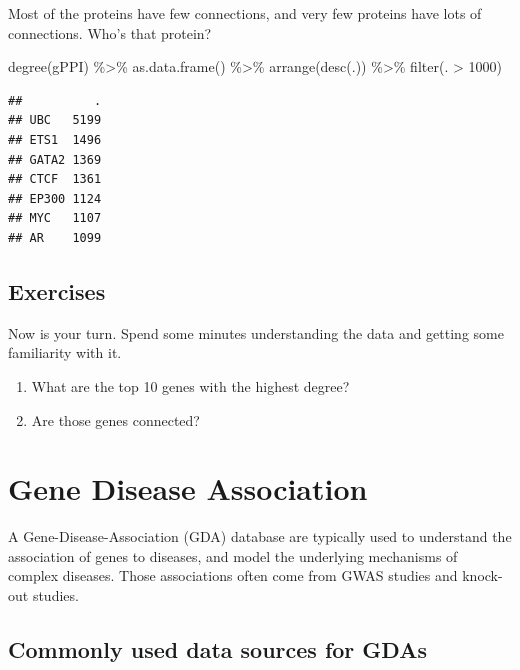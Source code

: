 \documentclass[
]{book}
\newenvironment{Shaded}{\begin{snugshade}}{\end{snugshade}}
\newcommand{\DecValTok}[1]{\textcolor[rgb]{0.00,0.00,0.81}{#1}}
\newcommand{\FunctionTok}[1]{\textcolor[rgb]{0.00,0.00,0.00}{#1}}
\newcommand{\NormalTok}[1]{#1}
\newcommand{\SpecialCharTok}[1]{\textcolor[rgb]{0.00,0.00,0.00}{#1}}
\begin{document}
Most of the proteins have few connections, and very few proteins have lots of connections. Who's that protein?

\begin{Shaded}
\begin{Highlighting}[]
\FunctionTok{degree}\NormalTok{(gPPI) }\SpecialCharTok{\%\textgreater{}\%} 
  \FunctionTok{as.data.frame}\NormalTok{() }\SpecialCharTok{\%\textgreater{}\%} 
  \FunctionTok{arrange}\NormalTok{(}\FunctionTok{desc}\NormalTok{(.)) }\SpecialCharTok{\%\textgreater{}\%}
  \FunctionTok{filter}\NormalTok{(. }\SpecialCharTok{\textgreater{}} \DecValTok{1000}\NormalTok{) }
\end{Highlighting}
\end{Shaded}

\begin{verbatim}
##          .
## UBC   5199
## ETS1  1496
## GATA2 1369
## CTCF  1361
## EP300 1124
## MYC   1107
## AR    1099
\end{verbatim}

\hypertarget{exercises}{%
\subsection{Exercises}\label{exercises}}

Now is your turn. Spend some minutes understanding the data and getting some familiarity with it.

\begin{enumerate}
\def\labelenumi{\arabic{enumi}.}
\item
  What are the top 10 genes with the highest degree?
\item
  Are those genes connected?
\end{enumerate}

\hypertarget{GDA}{%
\section{Gene Disease Association}\label{GDA}}

A Gene-Disease-Association (GDA) database are typically used to understand the association of genes to diseases, and model the underlying mechanisms of complex diseases. Those associations often come from GWAS studies and knock-out studies.

\hypertarget{commonly-used-data-sources-for-gdas}{%
\subsection{Commonly used data sources for GDAs}\label{commonly-used-data-sources-for-gdas}}
\end{document}
